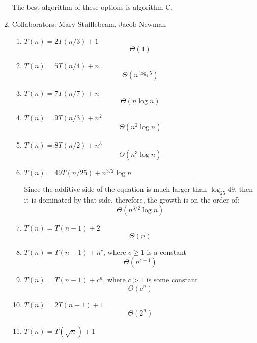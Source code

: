 \documentclass[11pt]{article}
\begin{document}
\begin{enumerate}
The best algorithm of these options is algorithm C.
\newpage

\item 
Collaborators: Mary Stufflebeam, Jacob Newman
\begin{enumerate}
\item $T (n) = 2T (n/3) + 1$
\begin{equation*}
\Theta(1)
\end{equation*}
\item $T (n) = 5T (n/4) + n$
\begin{equation*}
\Theta\left(n^{\log_4 5}\right)
\end{equation*}
\item $T (n) = 7T (n/7) + n$
\begin{equation*}
\Theta(n \log n)
\end{equation*}
\item $T (n) = 9T (n/3) + n^2$
\begin{equation*}
\Theta(n^2 \log n)
\end{equation*}
\item $T (n) = 8T (n/2) + n^3$
\begin{equation*}
\Theta(n^3 \log n)
\end{equation*}
\item $T (n) = 49T (n/25) + n^{3/2} \log n$

Since the additive side of the equation is much larger than $\log_{25}49$, then
it is dominated by that side, therefore, the growth is on the order of:
\begin{equation*}
\Theta(n^{3/2} \log n)
\end{equation*}
\item $T (n) = T (n - 1) + 2$
\begin{equation*}
\Theta(n)
\end{equation*}
\item $T (n) = T (n - 1) + n^c$, where $c \ge 1$ is a constant
\begin{equation*}
\Theta(n^{c+1})
\end{equation*}
\item $T (n) = T (n - 1) + c^n$, where $c > 1$ is some constant
\begin{equation*}
\Theta(c^n)
\end{equation*}
\item $T (n) = 2T (n - 1) + 1$
\begin{equation*}
\Theta(2^n)
\end{equation*}
\item $T (n) = T (\sqrt{n}) + 1$


\end{enumerate}
\end{enumerate}
\end{document}
